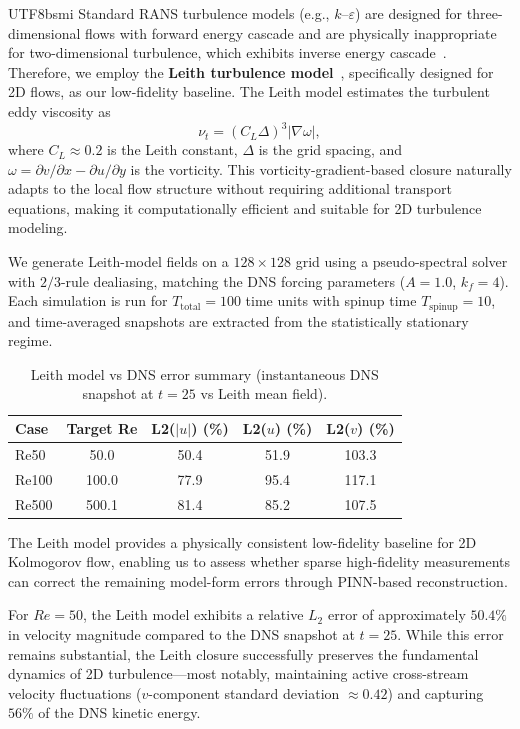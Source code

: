 \documentclass[master]{NTHUthesis}
\begin{document}
\begin{CJK*}{UTF8}{bsmi}
Standard RANS turbulence models (e.g., $k$--$\varepsilon$) are designed for three-dimensional flows with forward energy cascade and are physically inappropriate for two-dimensional turbulence, which exhibits inverse energy cascade~\cite{Boffetta2012ARFM}. Therefore, we employ the \textbf{Leith turbulence model}~\cite{Leith1996PhysFluids}, specifically designed for 2D flows, as our low-fidelity baseline. The Leith model estimates the turbulent eddy viscosity as
\begin{equation}
    \nu_t = (C_L \Delta)^3 |\nabla \omega|,
\end{equation}
where $C_L \approx 0.2$ is the Leith constant, $\Delta$ is the grid spacing, and $\omega = \partial v/\partial x - \partial u/\partial y$ is the vorticity. This vorticity-gradient-based closure naturally adapts to the local flow structure without requiring additional transport equations, making it computationally efficient and suitable for 2D turbulence modeling.

We generate Leith-model fields on a $128 \times 128$ grid using a pseudo-spectral solver with $2/3$-rule dealiasing, matching the DNS forcing parameters ($A=1.0$, $k_f=4$). Each simulation is run for $T_{\text{total}}=100$ time units with spinup time $T_{\text{spinup}}=10$, and time-averaged snapshots are extracted from the statistically stationary regime.

\begin{table}[htbp]
    \centering
\caption{Leith model vs DNS error summary (instantaneous DNS snapshot at $t=25$ vs Leith mean field).}
    \label{tab:leith_dns_error}
    \begin{tabular}{lcccc}
    \toprule
    \textbf{Case} & \textbf{Target Re} & \textbf{L2($|u|$) (\%)} & \textbf{L2($u$) (\%)} & \textbf{L2($v$) (\%)} \\
    \midrule
    Re50  & 50.0  & 50.4 & 51.9 & 103.3 \\
    Re100 & 100.0 & 77.9 & 95.4 & 117.1 \\
    Re500 & 500.1 & 81.4 & 85.2 & 107.5 \\
    \bottomrule
    \end{tabular}
\end{table}

The Leith model provides a physically consistent low-fidelity baseline for 2D Kolmogorov flow, enabling us to assess whether sparse high-fidelity measurements can correct the remaining model-form errors through PINN-based reconstruction.

For $Re=50$, the Leith model exhibits a relative $L_2$ error of approximately $50.4\%$ in velocity magnitude compared to the DNS snapshot at $t=25$. While this error remains substantial, the Leith closure successfully preserves the fundamental dynamics of 2D turbulence---most notably, maintaining active cross-stream velocity fluctuations ($v$-component standard deviation $\approx 0.42$) and capturing $56\%$ of the DNS kinetic energy. 


\end{CJK*}
\end{document}
